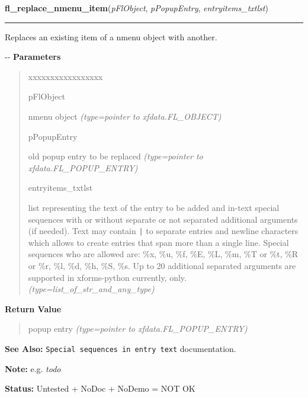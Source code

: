 \hspace{.8\funcindent}\begin{boxedminipage}{\funcwidth}

    \raggedright \textbf{fl\_replace\_nmenu\_item}(\textit{pFlObject}, \textit{pPopupEntry}, \textit{entryitems\_txtlst})

    \vspace{-1.5ex}

    \rule{\textwidth}{0.5\fboxrule}
\setlength{\parskip}{2ex}

Replaces an existing item of a nmenu object with another.

-{}-
\setlength{\parskip}{1ex}
      \textbf{Parameters}
      \vspace{-1ex}

      \begin{quote}
        \begin{Ventry}{xxxxxxxxxxxxxxxxx}

          \item[pFlObject]


nmenu object
            {\it (type=pointer to xfdata.FL\_OBJECT)}

          \item[pPopupEntry]


old popup entry to be replaced
            {\it (type=pointer to xfdata.FL\_POPUP\_ENTRY)}

          \item[entryitems\_txtlst]


list representing the text of the entry to be added and in-text
special sequences with or without separate or not separated additional
arguments (if needed). Text may contain \texttt{|} to separate entries and
newline characters which allows to create entries that span more than
a single line. Special sequences who are allowed are: \%x, \%u, \%f, \%E,
\%L, \%m, \%T or \%t, \%R or \%r, \%l, \%d, \%h, \%S, \%s. Up to 20 additional
separated arguments are supported in xforms-python currently, only.
            {\it (type=list\_of\_str\_and\_any\_type)}

        \end{Ventry}

      \end{quote}

      \textbf{Return Value}
    \vspace{-1ex}

      \begin{quote}

popup entry
      {\it (type=pointer to xfdata.FL\_POPUP\_ENTRY)}

      \end{quote}

\textbf{See Also:} 
\texttt{Special sequences in entry text} documentation.


\textbf{Note:} 
e.g. \emph{todo}


\textbf{Status:} 
Untested + NoDoc + NoDemo = NOT OK


    \end{boxedminipage}


